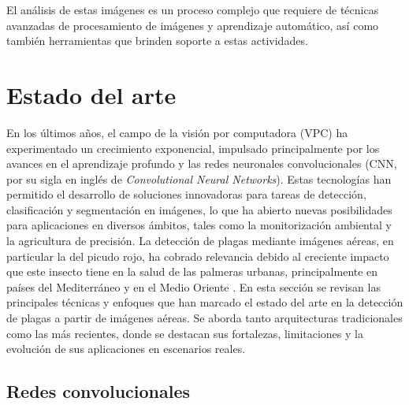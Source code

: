 
El análisis de estas imágenes es un proceso complejo que requiere de técnicas avanzadas de procesamiento de imágenes y aprendizaje automático, así como también herramientas que brinden soporte a estas actividades.

\section{Estado del arte}
\label{sec:estadoArte}

En los últimos años, el campo de la visión por computadora (VPC) ha experimentado un crecimiento exponencial, impulsado principalmente por los avances en el aprendizaje profundo y las redes neuronales convolucionales (CNN, por su sigla en inglés de \textit{Convolutional Neural Networks}). Estas tecnologías han permitido el desarrollo de soluciones innovadoras para tareas de detección, clasificación y segmentación en imágenes, lo que ha abierto nuevas posibilidades para aplicaciones en diversos ámbitos, tales como la monitorización ambiental y la agricultura de precisión. La detección de plagas mediante imágenes aéreas, en particular la del picudo rojo, ha cobrado relevancia debido al creciente impacto que este insecto tiene en la salud de las palmeras urbanas, principalmente en países del Mediterráneo y en el Medio Oriente \citep{poplin_palm_2014}.
En esta sección se revisan las principales técnicas y enfoques que han marcado el estado del arte en la detección de plagas a partir de imágenes aéreas. Se aborda tanto arquitecturas tradicionales como las más recientes, donde se destacan sus fortalezas, limitaciones y la evolución de sus aplicaciones en escenarios reales.

\subsection{Redes convolucionales}
\label{sec:redesConvolucionales}

